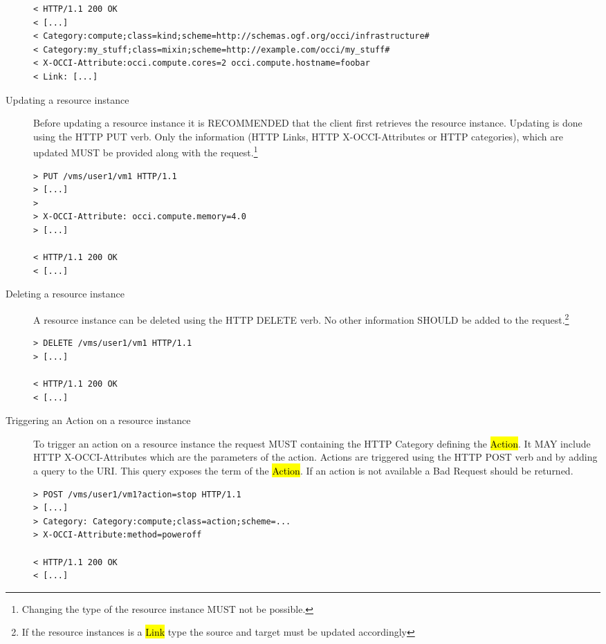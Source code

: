 \documentclass[10pt,a4paper]{article}
\begin{document}
\begin{description}
\begin{verbatim}
< HTTP/1.1 200 OK
< [...]
< Category:compute;class=kind;scheme=http://schemas.ogf.org/occi/infrastructure#
< Category:my_stuff;class=mixin;scheme=http://example.com/occi/my_stuff#
< X-OCCI-Attribute:occi.compute.cores=2 occi.compute.hostname=foobar
< Link: [...]
\end{verbatim}

\item[Updating a resource instance] Before updating a resource
  instance it is RECOMMENDED that the client first retrieves the
  resource instance. Updating is done using the HTTP PUT verb. Only
  the information (HTTP Links, HTTP X-OCCI-Attributes or HTTP
  categories), which are updated MUST be provided along with the
  request.\footnote{Changing the type of the resource instance MUST
    not be possible.}
\begin{verbatim}
> PUT /vms/user1/vm1 HTTP/1.1
> [...]
> 
> X-OCCI-Attribute: occi.compute.memory=4.0
> [...]
 
< HTTP/1.1 200 OK
< [...]
\end{verbatim}

\item[Deleting a resource instance] A resource instance can be deleted
  using the HTTP DELETE verb. No other information SHOULD be added to
  the request.\footnote{If the resource instances is a \hl{Link} type
    the source and target must be updated accordingly}
\begin{verbatim}
> DELETE /vms/user1/vm1 HTTP/1.1
> [...]

< HTTP/1.1 200 OK
< [...]
\end{verbatim}

\item[Triggering an Action on a resource instance] To trigger an
  action on a resource instance the request MUST containing the HTTP
  Category defining the \hl{Action}. It MAY include HTTP
  X-OCCI-Attributes which are the parameters of the action. Actions
  are triggered using the HTTP POST verb and by adding a query to
  the URI. This query exposes the term of the \hl{Action}. If an
  action is not available a Bad Request should be returned.
\begin{verbatim}
> POST /vms/user1/vm1?action=stop HTTP/1.1
> [...]
> Category: Category:compute;class=action;scheme=...
> X-OCCI-Attribute:method=poweroff

< HTTP/1.1 200 OK
< [...]
\end{verbatim}
\end{description}
\end{document}
